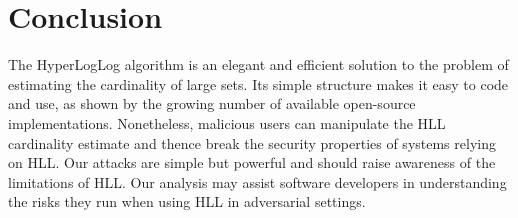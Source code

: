 \documentclass[11pt]{article}
\begin{document}
\begin{table}[h]
\centering
\caption{Attack results, averaged over 30 iterations.}
\label{table:tab1}
\end{table}

\begin{table}[h]
\centering
\caption{Attack results, averaged over 30 iterations, in the setting of \cite{hllvuln}.}
\label{table:tab2}
\end{table}

\section{Conclusion}\label{sec:conclusions}
The HyperLogLog algorithm is an elegant and efficient solution to the problem of estimating the cardinality of large sets. Its simple structure makes it easy to code and use, as shown by the growing number of available open-source implementations. Nonetheless, malicious users can manipulate the HLL cardinality estimate and thence break the security properties of systems relying on HLL. Our attacks are simple but powerful and should raise awareness of the limitations of HLL. Our analysis may assist software developers in understanding the risks they run when using HLL in adversarial settings.
\end{document}
